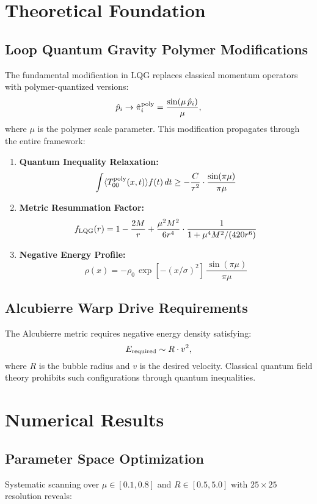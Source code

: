 \documentclass[11pt]{article}
\begin{document}
\section{Theoretical Foundation}

\subsection{Loop Quantum Gravity Polymer Modifications}
The fundamental modification in LQG replaces classical momentum operators with polymer-quantized versions:
\[
  \hat{p}_i \rightarrow \hat{\pi}_i^{\rm poly} = \frac{\sin(\mu\,\hat{p}_i)}{\mu},
\]
where $\mu$ is the polymer scale parameter. This modification propagates through the entire framework:

\begin{enumerate}
  \item \textbf{Quantum Inequality Relaxation:}
        \[
          \int \langle T_{00}^{\rm poly}(x,t) \rangle f(t)\,dt \geq -\frac{C}{\tau^2} \cdot \frac{\sin(\pi\mu)}{\pi\mu}
        \]
        
  \item \textbf{Metric Resummation Factor:}
        \[
          f_{\rm LQG}(r) = 1 - \frac{2M}{r} + \frac{\mu^2 M^2}{6r^4} \cdot \frac{1}{1 + \mu^4 M^2/(420r^6)}
        \]
        
  \item \textbf{Negative Energy Profile:}
        \[
          \rho(x) = -\rho_0\,\exp\left[-(x/\sigma)^2\right]\,\frac{\sin(\pi\mu)}{\pi\mu}
        \]
\end{enumerate}

\subsection{Alcubierre Warp Drive Requirements}
The Alcubierre metric requires negative energy density satisfying:
\[
  E_{\rm required} \sim R \cdot v^2,
\]
where $R$ is the bubble radius and $v$ is the desired velocity. Classical quantum field theory prohibits such configurations through quantum inequalities.

\section{Numerical Results}

\subsection{Parameter Space Optimization}
Systematic scanning over $\mu \in [0.1, 0.8]$ and $R \in [0.5, 5.0]$ with $25 \times 25$ resolution reveals:
\end{document}
